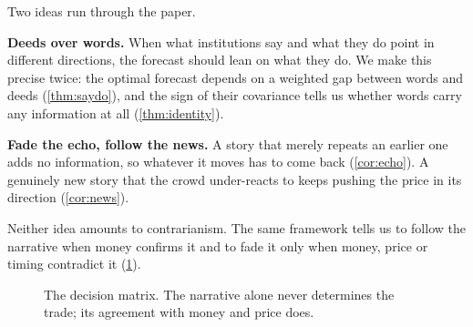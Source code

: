 \documentclass[11pt,a4paper]{article}
\theoremstyle{plain}
\theoremstyle{definition}
\theoremstyle{remark}
\begin{document}
Two ideas run through the paper.

\begin{keyidea}
\textbf{Deeds over words.} When what institutions say and what they do point in different directions, the forecast should lean on what they do. We make this precise twice: the optimal forecast depends on a weighted gap between words and deeds (\cref{thm:saydo}), and the sign of their covariance tells us whether words carry any information at all (\cref{thm:identity}).

\textbf{Fade the echo, follow the news.} A story that merely repeats an earlier one adds no information, so whatever it moves has to come back (\cref{cor:echo}). A genuinely new story that the crowd under-reacts to keeps pushing the price in its direction (\cref{cor:news}).
\end{keyidea}

Neither idea amounts to contrarianism. The same framework tells us to follow the narrative when money confirms it and to fade it only when money, price or timing contradict it (\cref{fig:matrix}).

\begin{figure}[ht]
\centering
{}
\caption{The decision matrix. The narrative alone never determines the trade; its agreement with money and price does.}
\label{fig:matrix}
\end{figure}
\end{document}
